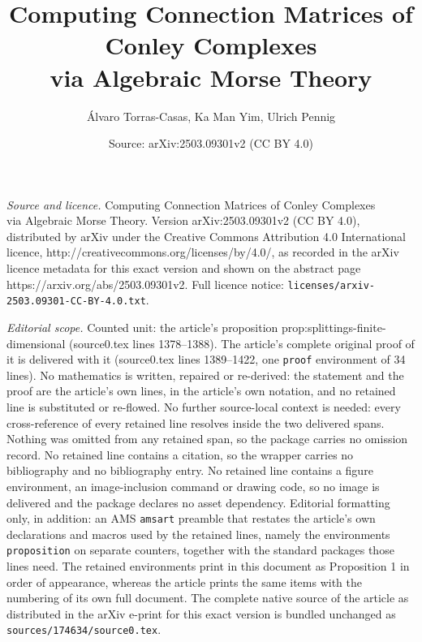 \documentclass[10pt,a4paper]{amsart}
\title{Computing Connection Matrices of Conley Complexes \\ via Algebraic Morse Theory}
\author{\'Alvaro Torras-Casas, Ka Man Yim, Ulrich Pennig}
\date{Source: arXiv:2503.09301v2 (CC BY 4.0)}
\begin{document}
\maketitle

\noindent\emph{Source and licence.} Computing Connection Matrices of Conley Complexes \\ via Algebraic Morse Theory. Version arXiv:2503.09301v2 (CC BY 4.0), distributed by arXiv under the Creative Commons Attribution 4.0 International licence, http://creativecommons.org/licenses/by/4.0/, as recorded in the arXiv licence metadata for this exact version and shown on the abstract page https://arxiv.org/abs/2503.09301v2. Full licence notice: \texttt{licenses/arxiv-2503.09301-CC-BY-4.0.txt}.\par\smallskip

\noindent\textit{Editorial scope.} Counted unit: the article's proposition prop:splittings-finite-dimensional (source0.tex lines 1378--1388). The article's complete original proof of it is delivered with it (source0.tex lines 1389--1422, one \texttt{proof} environment of 34 lines). No mathematics is written, repaired or re-derived: the statement and the proof are the article's own lines, in the article's own notation, and no retained line is substituted or re-flowed.  No further source-local context is needed: every cross-reference of every retained line resolves inside the two delivered spans.  Nothing was omitted from any retained span, so the package carries no omission record.  No retained line contains a citation, so the wrapper carries no bibliography and no bibliography entry.  No retained line contains a figure environment, an image-inclusion command or drawing code, so no image is delivered and the package declares no asset dependency.  Editorial formatting only, in addition: an AMS \texttt{amsart} preamble that restates the article's own declarations and macros used by the retained lines, namely the environments \texttt{proposition} on separate counters, together with the standard packages those lines need.  The retained environments print in this document as Proposition 1 in order of appearance, whereas the article prints the same items with the numbering of its own full document.  The complete native source of the article as distributed in the arXiv e-print for this exact version is bundled unchanged as \texttt{sources/174634/source0.tex}.
\end{document}
